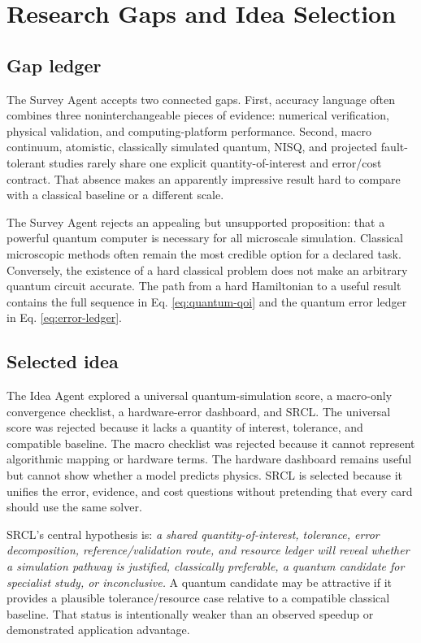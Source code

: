 \documentclass[conference]{../../../../Conference-LaTeX-template_10-17-19/IEEEtran}
\begin{document}
\section{Research Gaps and Idea Selection}
\subsection{Gap ledger}
The Survey Agent accepts two connected gaps. First, accuracy language often combines three noninterchangeable pieces of evidence: numerical verification, physical validation, and computing-platform performance. Second, macro continuum, atomistic, classically simulated quantum, NISQ, and projected fault-tolerant studies rarely share one explicit quantity-of-interest and error/cost contract. That absence makes an apparently impressive result hard to compare with a classical baseline or a different scale.

The Survey Agent rejects an appealing but unsupported proposition: that a powerful quantum computer is necessary for all microscale simulation. Classical microscopic methods often remain the most credible option for a declared task. Conversely, the existence of a hard classical problem does not make an arbitrary quantum circuit accurate. The path from a hard Hamiltonian to a useful result contains the full sequence in Eq. \eqref{eq:quantum-qoi} and the quantum error ledger in Eq. \eqref{eq:error-ledger}.

\subsection{Selected idea}
The Idea Agent explored a universal quantum-simulation score, a macro-only convergence checklist, a hardware-error dashboard, and SRCL. The universal score was rejected because it lacks a quantity of interest, tolerance, and compatible baseline. The macro checklist was rejected because it cannot represent algorithmic mapping or hardware terms. The hardware dashboard remains useful but cannot show whether a model predicts physics. SRCL is selected because it unifies the error, evidence, and cost questions without pretending that every card should use the same solver.

SRCL’s central hypothesis is: \emph{a shared quantity-of-interest, tolerance, error decomposition, reference/validation route, and resource ledger will reveal whether a simulation pathway is justified, classically preferable, a quantum candidate for specialist study, or inconclusive.} A quantum candidate may be attractive if it provides a plausible tolerance/resource case relative to a compatible classical baseline. That status is intentionally weaker than an observed speedup or demonstrated application advantage.
\end{document}
